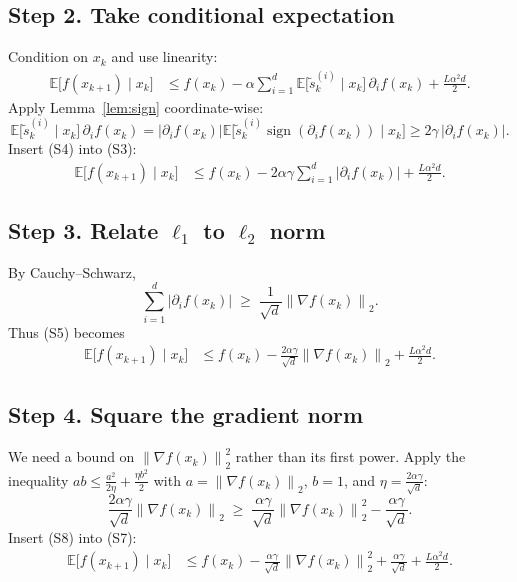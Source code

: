 \documentclass{article}
\newcommand{\sign}{\operatorname{sign}}
\newcommand{\E}{\mathbb{E}}
\newcommand{\norm}[1]{\left\|#1\right\|}
\begin{document}
\subsection*{Step 2. Take conditional expectation}
Condition on $x_k$ and use linearity:
\begin{align}
\E\!\bigl[f(x_{k+1})\mid x_k\bigr]
&\le f(x_k)-\alpha\sum_{i=1}^{d}
    \E\!\bigl[\tilde{s}_k^{(i)}\mid x_k\bigr]\,
    \partial_i f(x_k)
    +\frac{L\alpha^{2}d}{2}.
\tag{S3}
\end{align}
Apply Lemma~\ref{lem:sign} coordinate‑wise:
\[
\E\!\bigl[\tilde{s}_k^{(i)}\mid x_k\bigr]\,
\partial_i f(x_k)
=|\partial_i f(x_k)|
    \E\!\bigl[\tilde{s}_k^{(i)}\sign(\partial_i f(x_k))\mid x_k\bigr]
\ge 2\gamma\,|\partial_i f(x_k)|.
\tag{S4}
\]
Insert (S4) into (S3):
\begin{align}
\E\!\bigl[f(x_{k+1})\mid x_k\bigr]
&\le f(x_k)-2\alpha\gamma\sum_{i=1}^{d}|\partial_i f(x_k)|
    +\frac{L\alpha^{2}d}{2}.
\tag{S5}
\end{align}

\subsection*{Step 3. Relate $\ell_{1}$ to $\ell_{2}$ norm}
By Cauchy–Schwarz,
\[
\sum_{i=1}^{d}|\partial_i f(x_k)|
\;\ge\;
\frac{1}{\sqrt d}\norm{\nabla f(x_k)}_{2}.
\tag{S6}
\]
Thus (S5) becomes
\begin{align}
\E\!\bigl[f(x_{k+1})\mid x_k\bigr]
&\le f(x_k)-\frac{2\alpha\gamma}{\sqrt d}
      \norm{\nabla f(x_k)}_{2}
    +\frac{L\alpha^{2}d}{2}.
\tag{S7}
\end{align}

\subsection*{Step 4. Square the gradient norm}
We need a bound on $\norm{\nabla f(x_k)}_{2}^{2}$ rather than its first power.  
Apply the inequality $ab\le \frac{a^{2}}{2\eta}+\frac{\eta b^{2}}{2}$ with
$a=\norm{\nabla f(x_k)}_{2}$, $b=1$, and $\eta=\frac{2\alpha\gamma}{\sqrt d}$:
\[
\frac{2\alpha\gamma}{\sqrt d}\norm{\nabla f(x_k)}_{2}
\;\ge\;
\frac{\alpha\gamma}{\sqrt d}\norm{\nabla f(x_k)}_{2}^{2}
    -\frac{\alpha\gamma}{\sqrt d}.
\tag{S8}
\]
Insert (S8) into (S7):
\begin{align}
\E\!\bigl[f(x_{k+1})\mid x_k\bigr]
&\le f(x_k)-\frac{\alpha\gamma}{\sqrt d}\norm{\nabla f(x_k)}_{2}^{2}
    +\frac{\alpha\gamma}{\sqrt d}
    +\frac{L\alpha^{2}d}{2}.
\tag{S9}
\end{align}
\end{document}

